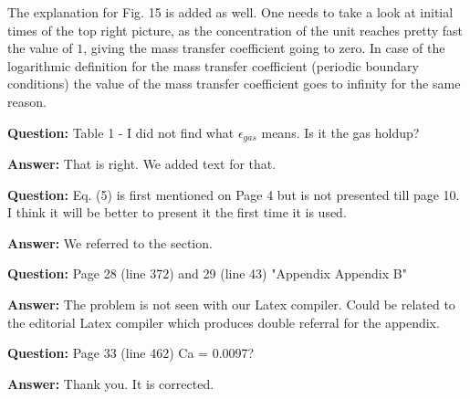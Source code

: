 \documentclass{article}
\begin{document}
The explanation for Fig. 15 is added as well. One needs to take a look at initial times of the top right picture, as the concentration of the unit reaches pretty fast the value of $1$, giving the mass transfer coefficient going to zero. In case of the logarithmic definition for the mass transfer coefficient (periodic boundary conditions) the value of the mass transfer coefficient goes to infinity for the same reason.

\textbf{Question:} Table 1 - I did not find what $\epsilon_{gas}$ means. Is it the gas holdup?

\textbf{Answer:} That is right. We added text for that.

\textbf{Question:} Eq. (5) is first mentioned on Page 4 but is not presented till page 10. I think it will be better to present it the first time it is used.

\textbf{Answer:} We referred to the section.
 
\textbf{Question:} Page 28 (line 372) and 29 (line 43) "Appendix Appendix B"

\textbf{Answer:} The problem is not seen with our Latex compiler. Could be related to the editorial Latex compiler which produces double referral for the appendix.

\textbf{Question:} Page 33 (line 462) Ca = 0.0097?

\textbf{Answer:} Thank you. It is corrected.




\end{document}
